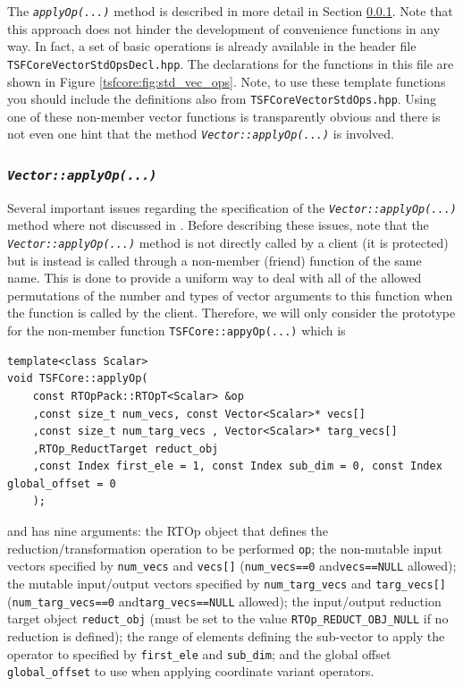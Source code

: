 \documentclass[10pt,fleqn]{article}
\begin{document}
The \texttt{\textit{applyOp(...)}}  method is described in more detail
in Section \ref{tsfcore:sec:vec_apply_op}.  Note that this approach does
not hinder the development of convenience functions in any way.  In
fact, a set of basic operations is already available in the header
file \texttt{TSFCoreVectorStdOpsDecl.hpp}.  The declarations for the
functions in this file are shown in Figure \ref{tsfcore:fig:std_vec_ops}.
Note, to use these template functions you should include the
definitions also from \texttt{TSFCoreVectorStdOps.hpp}.
Using one of these non-member vector functions is transparently
obvious and there is not even one hint that the method
\texttt{\textit{Vector::applyOp(...)}} is involved.

%
\subsubsection{\texttt{\textit{Vector::applyOp(...)}}}
\label{tsfcore:sec:vec_apply_op}
%

Several important issues regarding the specification of the
\texttt{\textit{Vector::applyOp(...)}} method where not discussed in
\cite{ref:rtop_toms}.  Before describing these issues, note that the
\texttt{\textit{Vector\-::applyOp(...)}} method is not directly called
by a client (it is protected) but is instead is called through a
non-member (friend) function of the same name.  This is done to
provide a uniform way to deal with all of the allowed permutations of
the number and types of vector arguments to this function when the
function is called by the client.  Therefore, we will only consider
the prototype for the non-member function \texttt{TSFCore::appyOp(...)}
which is

{\scriptsize\begin{verbatim}
template<class Scalar>
void TSFCore::applyOp(
    const RTOpPack::RTOpT<Scalar> &op
    ,const size_t num_vecs, const Vector<Scalar>* vecs[]
    ,const size_t num_targ_vecs , Vector<Scalar>* targ_vecs[]
    ,RTOp_ReductTarget reduct_obj
    ,const Index first_ele = 1, const Index sub_dim = 0, const Index global_offset = 0
    );
\end{verbatim}}

and has nine arguments: the RTOp object that defines the
reduction/transformation operation to be performed \texttt{op}; the
non-mutable input vectors specified by \texttt{num\_vecs} and
\texttt{vecs[]} (\texttt{num\_vecs==0} and\texttt{vecs==NULL}
allowed); the mutable input/output vectors specified by
\texttt{num\_targ\_vecs} and \texttt{targ\_vecs[]}
(\texttt{num\_targ\_vecs==0} and\texttt{targ\_vecs==NULL} allowed);
the input/output reduction target object \texttt{reduct\_obj} (must be
set to the value \texttt{RTOp\_REDUCT\_OBJ\_NULL} if no reduction is
defined); the range of elements defining the sub-vector to apply the
operator to specified by \texttt{first\_ele} and \texttt{sub\_dim};
and the global offset \texttt{global\_offset} to use when applying
coordinate variant operators.
\end{document}
